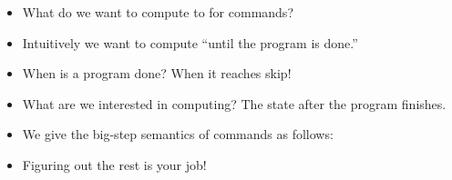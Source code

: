 \documentclass{lecturenotes}
\newcommand{\ite}[3]{\ensuremath{\textsf{if}\mkern5mu#1 \mathrel{\textsf{then}} #2 \mathrel{\textsf{else}} #3}}
\newcommand{\while}[2]{\ensuremath{\textsf{while}\mkern5mu#1 \mathrel{\textsf{do}} #2}}
\newcommand{\itrue}{\textsf{true}}
\newcommand{\ifalse}{\textsf{false}}
\begin{document}
\begin{itemize}
\item What do we want to compute to for commands?
\item Intuitively  we want to compute ``until the program is done.''  
\item When is a program done?
  When it reaches \textsf{skip}!
\item What are we interested in computing?
  The state after the program finishes.
\item We give the big-step semantics of commands as follows:
\item Figuring out the rest is your job!
\end{itemize}
\end{document}
